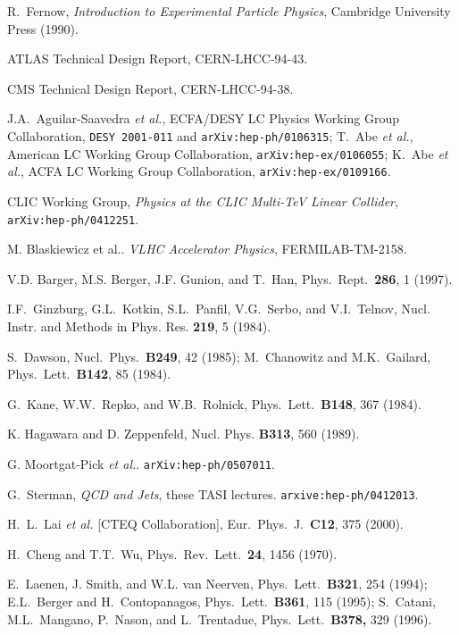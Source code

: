 \documentclass[12pt,prd,aps,floats,preprintnumbers,preprint,superscriptaddress,floatfix,nofootinbib]{revtex4}
\begin{document}
\begin{thebibliography}{99}
R.~Fernow, {\it Introduction to 
Experimental Particle Physics}, Cambridge University Press (1990).

ATLAS Technical Design Report, CERN-LHCC-94-43.

 CMS Technical Design Report, CERN-LHCC-94-38.

J.A.~Aguilar-Saavedra {\it et al.}, ECFA/DESY LC
Physics Working Group Collaboration, {\tt DESY 2001-011}
and {\tt arXiv:hep-ph/0106315};
T.~Abe {\it et al.}, American LC Working Group Collaboration, 
{\tt arXiv:hep-ex/0106055};
K.~Abe {\it et al.}, ACFA LC Working Group Collaboration, 
{\tt arXiv:hep-ex/0109166}.

CLIC Working Group, {\it Physics at the CLIC Multi-TeV
Linear Collider}, {\tt arXiv:hep-ph/0412251}.

 M. Blaskiewicz et al..  {\it VLHC Accelerator Physics},
FERMILAB-TM-2158.

V.D. Barger, M.S. Berger, J.F. Gunion, and T.~Han, 
Phys.~Rept.~{\bf 286}, 1 (1997).

 I.F.~Ginzburg, G.L.~Kotkin, S.L.~Panfil, V.G.~Serbo,
and V.I.~Telnov, Nucl. Instr. and Methods in Phys. Res. {\bf  219}, 5 (1984).

S.~Dawson, Nucl.~Phys.~{\bf B249}, 42 (1985); 
M.~Chanowitz and M.K.~Gailard, Phys.~Lett.~{\bf B142}, 85 (1984).

 G.~Kane, W.W.~Repko, and W.B.~Rolnick, 
 Phys.~Lett.~{\bf B148}, 367 (1984).
 
K. Hagawara and D. Zeppenfeld, Nucl. Phys. {\bf B313}, 560 (1989).

G. Moortgat-Pick {\it et al.}. {\tt  arXiv:hep-ph/0507011}.

G.~Sterman, {\it QCD and Jets},  these TASI lectures.
{\tt arxive:hep-ph/0412013}.

  H.~L.~Lai {\it et al.}  [CTEQ Collaboration],
  Eur.\ Phys.\ J.~{\bf C12}, 375 (2000).

 H.~Cheng and T.T.~Wu, Phys.~Rev.~Lett.~{\bf 24}, 1456 (1970).

 E.~Laenen, J. Smith, and W.L. van Neerven, Phys.~Lett.~{\bf B321}, 254 (1994); 
  E.L.~Berger and H.~Contopanagos, Phys.~Lett.~{\bf B361}, 115 (1995); 
 S.~Catani, M.L.~Mangano, P.~Nason, and L.~Trentadue, 
 Phys.~Lett.~{\bf B378,} 329 (1996).
 

\end{thebibliography}
\end{document}
